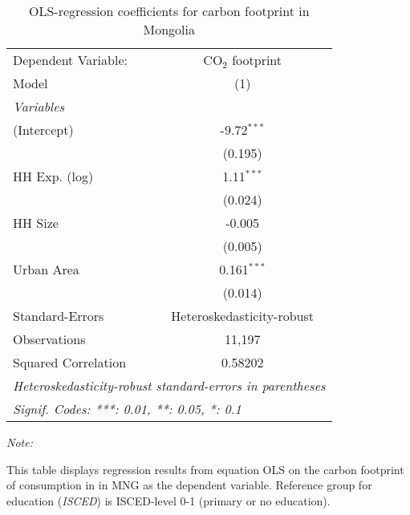 
\begin{table}[htbp!]
   \centering
   \small
   \begin{adjustbox}{width = 1\textwidth, max height = 0.95\textheight, center}
      \begin{threeparttable}[b]
         \caption{\label{tab:OLS_2_MNG} OLS-regression coefficients for carbon footprint in Mongolia}
         \begin{tabular}{lc}
            \tabularnewline \midrule \midrule
            Dependent Variable: & CO$_{2}$ footprint\\  
            Model               & (1)\\  
            \midrule
            \emph{Variables}\\
            (Intercept)         & -9.72$^{***}$\\   
                                & (0.195)\\   
            HH Exp. (log)       & 1.11$^{***}$\\   
                                & (0.024)\\   
            HH Size             & -0.005\\   
                                & (0.005)\\   
            Urban Area          & 0.161$^{***}$\\   
                                & (0.014)\\   
            \midrule 
            Standard-Errors     & Heteroskedasticity-robust \\   
            Observations        & 11,197\\  
            Squared Correlation & 0.58202\\  
            \midrule \midrule
            \multicolumn{2}{l}{\emph{Heteroskedasticity-robust standard-errors in parentheses}}\\
            \multicolumn{2}{l}{\emph{Signif. Codes: ***: 0.01, **: 0.05, *: 0.1}}\\
         \end{tabular}
         
         \begin{tablenotes}\item \medskip \textit{Note:}
            \item This table displays regression results from equation OLS on the carbon footprint of consumption in  in MNG as the dependent variable.  Reference group for education (\textit{ISCED}) is ISCED-level 0-1 (primary or no education).
         \end{tablenotes}
      \end{threeparttable}
   \end{adjustbox}
\end{table}



